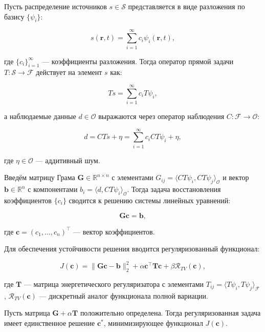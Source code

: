 \documentclass[a4paper,14pt,oneside,openany]{extarticle}
\begin{document}
Пусть распределение источников $s \in \mathcal{S}$ представляется в виде разложения по базису $\{\psi_i\}$:

\begin{equation}
    s(\mathbf{r}, t) = \sum_{i=1}^\infty c_i \psi_i(\mathbf{r}, t),
\end{equation}

где $\{c_i\}_{i=1}^\infty$ --- коэффициенты разложения. Тогда оператор прямой задачи $T: \mathcal{S} \to \mathcal{F}$ действует на элемент $s$ как:

\begin{equation}
    Ts = \sum_{i=1}^\infty c_i T\psi_i,
\end{equation}

а наблюдаемые данные $d \in \mathcal{O}$ выражаются через оператор наблюдения $C: \mathcal{F} \to \mathcal{O}$:

\begin{equation}
    d = C Ts + \eta = \sum_{i=1}^\infty c_i C T \psi_i + \eta,
\end{equation}

где $\eta \in \mathcal{O}$ --- аддитивный шум.

Введём матрицу Грама $\mathbf{G} \in \mathbb{R}^{n \times n}$ с элементами $G_{ij} = \langle C T \psi_i, C T \psi_j \rangle_{\mathcal{O}}$ и вектор $\mathbf{b} \in \mathbb{R}^n$ с компонентами $b_i = \langle d, C T \psi_i \rangle_{\mathcal{O}}$. Тогда задача восстановления коэффициентов $\{c_i\}$ сводится к решению системы линейных уравнений:

\begin{equation}
    \mathbf{G} \mathbf{c} = \mathbf{b},
\end{equation}

где $\mathbf{c} = (c_1, \dots, c_n)^\top$ --- вектор коэффициентов.

Для обеспечения устойчивости решения вводится регуляризованный функционал:

\begin{equation}
    J(\mathbf{c}) = \|\mathbf{G} \mathbf{c} - \mathbf{b}\|_2^2 + \alpha \mathbf{c}^\top \mathbf{T} \mathbf{c} + \beta \mathcal{R}_{TV}(\mathbf{c}),
\end{equation}

где $\mathbf{T}$ --- матрица энергетического регуляризатора с элементами $T_{ij} = \langle T \psi_i, T \psi_j \rangle_{\mathcal{F}}$, $\mathcal{R}_{TV}(\mathbf{c})$ --- дискретный аналог функционала полной вариации.

\begin{theorem}
Пусть матрица $\mathbf{G} + \alpha \mathbf{T}$ положительно определена. Тогда регуляризованная задача имеет единственное решение $\mathbf{c}^*$, минимизирующее функционал $J(\mathbf{c})$.
\end{theorem}
\end{document}
